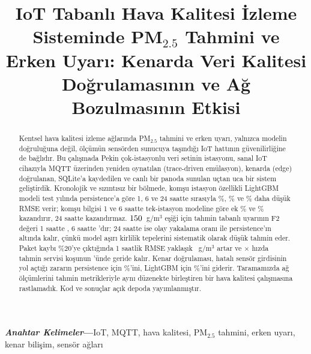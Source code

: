 \documentclass[conference]{IEEEtran}
\newcommand{\ugm}{\textmu g/m$^3$}
\newcommand{\pmtwo}{PM$_{2.5}$}
\begin{document}
\title{IoT Tabanlı Hava Kalitesi İzleme Sisteminde \pmtwo{} Tahmini ve Erken Uyarı: Kenarda Veri Kalitesi Doğrulamasının ve Ağ Bozulmasının Etkisi}

\author{
}

\maketitle

\begin{abstract}
Kentsel hava kalitesi izleme ağlarında \pmtwo{} tahmini ve erken uyarı, yalnızca modelin doğruluğuna değil, ölçümün sensörden sunucuya taşındığı IoT hattının güvenilirliğine de bağlıdır. Bu çalışmada Pekin çok-istasyonlu veri setinin \nDataStations{} istasyonu, \nDataStations{} sanal IoT cihazıyla MQTT üzerinden yeniden oynatılan (trace-driven emülasyon), kenarda (edge) doğrulanan, SQLite'a kaydedilen ve canlı bir panoda sunulan uçtan uca bir sistem geliştirdik. Kronolojik ve sızıntısız bir bölmede, komşu istasyon özellikli LightGBM modeli test yılında persistence'a göre 1, 6 ve 24 saatte sırasıyla \%\nImprMtwobHOne{}, \%\nImprMtwobHSix{} ve \%\nImprMtwobHTwentyFour{} daha düşük RMSE verir; komşu bilgisi 1 ve 6 saatte tek-istasyon modeline göre ek \%\nAblKelevenHOne{} ve \%\nAblKelevenHSix{} kazandırır, 24 saatte kazandırmaz. $150{}$~\ugm{} eşiği için tahmin tabanlı uyarının F2 değeri 1 saatte \nWarnFtwoMtwobHOne{}, 6 saatte \nWarnFtwoMtwobHSix{}'dır; 24 saatte ise olay yakalama oranı \nWarnEvRecMtwobHTwentyFour{} ile persistence'ın altında kalır, çünkü model aşırı kirlilik tepelerini sistematik olarak düşük tahmin eder. Paket kaybı \%20'ye çıktığında 1 saatlik RMSE yaklaşık \nDmgTwenty{}~\ugm{} artar ve \nSpeedSlow{}$\times$ hızda tahmin servisi \nRunsTwenty{} koşunun \nBehindTwenty{}'ünde geride kalır. Kenar doğrulaması, hatalı sensör girdisinin yol açtığı zararın persistence için \%\nRobRecPersistHOne{}'ini, LightGBM için \%\nRobRecMtwobHOne{}'ini giderir. Taramamızda ağ ölçümlerini tahmin metrikleriyle aynı düzenekte birleştiren bir hava kalitesi çalışmasına rastlamadık. Kod ve sonuçlar açık depoda yayımlanmıştır.
\end{abstract}

\vspace{3pt}
\noindent\textbf{\textit{Anahtar Kelimeler}---}IoT, MQTT, hava kalitesi, \pmtwo{} tahmini, erken uyarı, kenar bilişim, sensör ağları
\end{document}
